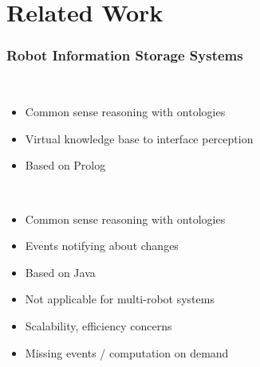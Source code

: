 \section{Related Work}
\begin{frame}[plain]
  \tableofcontents[currentsection]
\end{frame}
\addtocounter{framenumber}{-1}

\begin{frame}
  \frametitle{Robot Information Storage Systems}
  \begin{description}[]
  \item[KnowRob~\cite{KnowRob}]%
    \hfill \\
    \begin{itemize}
    \item Common sense reasoning with ontologies
    \item Virtual knowledge base to interface perception
    \item Based on Prolog
    \end{itemize}
  \end{description}
  \begin{description}[]
  \item[OpenRobots Ontology~\cite{Oro}]%
    \hfill \\
    \begin{itemize}
    \item Common sense reasoning with ontologies
    \item Events notifying about changes
    \item Based on  Java
    \end{itemize}
  \end{description}
  \begin{block}{}%
  \begin{itemize}
  \item Not applicable for multi-robot systems
  \item Scalability, efficiency concerns %
  \item Missing events / computation on demand
  \end{itemize}
  \end{block}
\end{frame}

